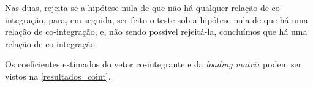 \documentclass[a4paper,
               article,
               12pt,
               openany,
               oneside,
               english,
               brazil]{abntex2}
\numberwithin{equation}{section}
\begin{document}
    \begin{table}[hbt]
        \begin{subtable}{.5\linewidth}
        \end{subtable}%
        \begin{subtable}{.5\linewidth}
        \end{subtable}%
    \end{table}

    Nas duas, rejeita-se a hipótese nula de que não há qualquer relação de co-integração, para, em seguida, ser feito o teste sob a hipótese nula de que há uma relação de co-integração, e, não sendo possível rejeitá-la, concluímos que há uma relação de co-integração.

    Os coeficientes estimados do vetor co-integrante e da \textit{loading matrix} podem ser vistos na \autoref{resultados_coint}. 
    
\end{document}
